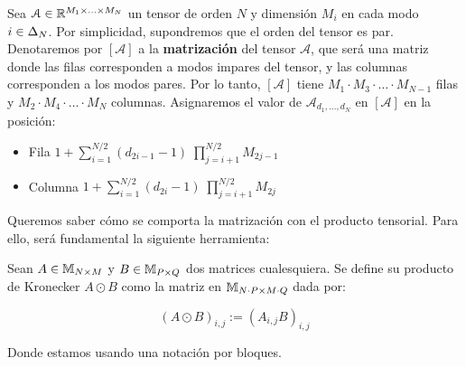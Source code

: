 \begin{definicion}

Sea $\mathcal{A} \in \mathbb{R}^{M_1 \times \ldots \times M_N}$ un tensor de orden $N$ y dimensión $M_i$ en cada modo $i \in \Delta_{N}$. Por simplicidad, supondremos que el orden del tensor es par. Denotaremos por $[\mathcal{A}]$ a la \textbf{matrización} del tensor $\mathcal{A}$, que será una matriz donde las filas corresponden a modos impares del tensor, y las columnas corresponden a los modos pares. Por lo tanto, $[\mathcal{A}]$ tiene $M_1 \cdot M_3 \cdot \ldots \cdot M_{N-1}$ filas y $M_2 \cdot M_4 \cdot \ldots \cdot M_N$ columnas. Asignaremos el valor de $\mathcal{A}_{d_1, \ldots, d_N}$ en $[\mathcal{A}]$ en la posición:

\begin{itemize}
    \item Fila $1 + \sum_{i = 1}^{N/2} (d_{2i - 1} - 1) \; \prod_{j = i + 1}^{N/2} M_{2j - 1}$
    \item Columna $1 + \sum_{i = 1}^{N/2} (d_{2i} - 1) \; \prod_{j = i + 1}^{N/2} M_{2j}$
\end{itemize}

\end{definicion}

Queremos saber cómo se comporta la matrización con el producto tensorial. Para ello, será fundamental la siguiente herramienta:

\begin{definicion}

    Sean $A \in \mathbb{M}_{N \times M}$ y  $B \in \mathbb{M}_{P \times Q}$ dos matrices cualesquiera. Se define su producto de Kronecker $A \odot B$ como la matriz en $\mathbb{M}_{N \cdot P \times M \cdot Q}$ dada por:

    \begin{equation}
        (A \odot B)_{i,j} := (A_{i, j} B)_{i, j}
    \end{equation}

    Donde estamos usando una notación por bloques.
\end{definicion}

